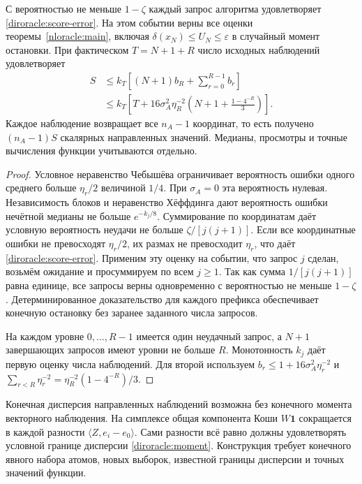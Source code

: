 \begin{theorem}
\label{diroracle:sampling}
С вероятностью не меньше $1-\zeta$ каждый запрос алгоритма
удовлетворяет \eqref{diroracle:score-error}.
На этом событии верны все оценки теоремы~\ref{nloracle:main},
включая $\delta(x_N)\le U_N\le\varepsilon$ в случайный момент остановки.
При фактическом $T=N+1+R$ число исходных наблюдений удовлетворяет
\begin{align}\label{diroracle:samples}
 S&\le k_T\left[(N+1)b_R+\sum_{r=0}^{R-1}b_r\right]\\
  &\le k_T\left[T+16\sigma_A^2\eta_R^{-2}
       \left(N+1+\frac{1-4^{-R}}3\right)\right].\nonumber
\end{align}
Каждое наблюдение возвращает все $n_A-1$ координат, то есть
получено $(n_A-1)S$ скалярных направленных значений.
Медианы, просмотры и точные вычисления функции учитываются отдельно.
\end{theorem}
\begin{proof}
Условное неравенство Чебышёва ограничивает вероятность ошибки
одного среднего больше $\eta_r/2$ величиной $1/4$.
При $\sigma_A=0$ эта вероятность нулевая.
Независимость блоков и неравенство Хёффдинга дают вероятность
ошибки нечётной медианы не больше $e^{-k_j/8}$.
Суммирование по координатам даёт условную вероятность неудачи
не больше $\zeta/[j(j+1)]$.
Если все координатные ошибки не превосходят $\eta_r/2$,
их размах не превосходит $\eta_r$, что даёт
\eqref{diroracle:score-error}.
Применим эту оценку на событии, что запрос $j$ сделан,
возьмём ожидание и просуммируем по всем $j\ge1$.
Так как сумма $1/[j(j+1)]$ равна единице, все запросы верны
одновременно с вероятностью не меньше $1-\zeta$.
Детерминированное доказательство для каждого префикса обеспечивает
конечную остановку без заранее заданного числа запросов.

На каждом уровне $0,\ldots,R-1$ имеется один неудачный запрос,
а $N+1$ завершающих запросов имеют уровни не больше $R$.
Монотонность $k_j$ даёт первую оценку числа наблюдений.
Для второй используем $b_r\le1+16\sigma_A^2\eta_r^{-2}$ и
$\sum_{r<R}\eta_r^{-2}=\eta_R^{-2}(1-4^{-R})/3$.
\end{proof}

Конечная дисперсия направленных наблюдений возможна без конечного
момента векторного наблюдения.
На симплексе общая компонента Коши $W\mathbf1$ сокращается
в каждой разности $\langle Z,e_i-e_0\rangle$.
Сами разности всё равно должны удовлетворять условной границе
дисперсии \eqref{diroracle:moment}.
Конструкция требует конечного явного набора атомов, новых выборок,
известной границы дисперсии и точных значений функции.
